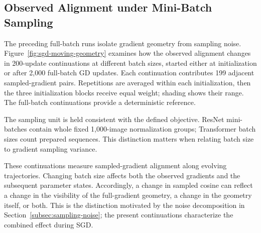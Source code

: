 \subsection{Observed Alignment under Mini-Batch Sampling}
\label{sec:sgd-noise-experiments}

The preceding full-batch runs isolate gradient geometry from sampling
noise. Figure~\ref{fig:sgd-moving-geometry} examines how the observed
alignment changes in 200-update continuations at different batch sizes,
started either at initialization or after 2,000 full-batch GD updates.
Each continuation contributes 199 adjacent sampled-gradient pairs.
Repetitions are averaged within each initialization, then the three
initialization blocks receive equal weight; shading shows their range.
The full-batch continuations provide a deterministic reference.


The sampling unit is held consistent with the defined objective.
ResNet mini-batches contain whole fixed 1,000-image normalization groups;
Transformer batch sizes count prepared sequences. This distinction
matters when relating batch size to gradient sampling variance.

These continuations measure sampled-gradient alignment along evolving
trajectories. Changing batch size affects both the observed gradients
and the subsequent parameter states. Accordingly, a change in sampled
cosine can reflect a change in the visibility of the full-gradient
geometry, a change in the geometry itself, or both. This is the distinction
motivated by the noise decomposition in
Section~\ref{subsec:sampling-noise}; the present continuations characterize
the combined effect during SGD.
